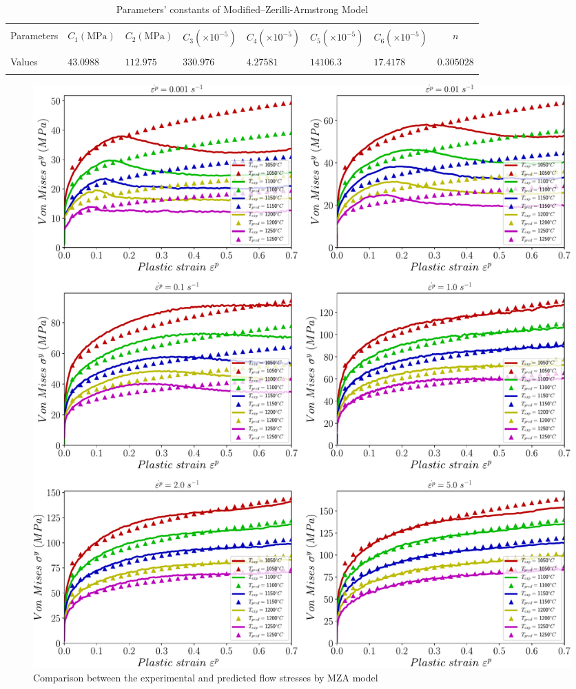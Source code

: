 \documentclass[twoside,english,1p,final,sort&compress]{elsarticle}
\theoremstyle{plain}
\begin{document}
\begin{table}[h!]
\centering{}
\caption{Parameters' constants of Modified--Zerilli-Armstrong Model}
\begin{tabular}{lllllllc}
\hline
&         &             &		   &		 &			   &&\\
Parameters&$C_1(\text{MPa})$    &$C_2(\text{MPa})$        & $C_3(\times10^{-5})$     & $C_4(\times10^{-5})$   & $C_5(\times10^{-5})$       &$C_6(\times10^{-5})$&$n$\\
&         &             &		   &	     &	           &&\\
\hline
Values&$43.0988$&$112.975$& $330.976$&$4.27581$&$14106.3$&$17.4178$&$0.305028$\\
\hline
\label{tab: MZAparameters}
\end{tabular}
\end{table}
\begin{figure}[!ht]
\centering
\includegraphics[width=1.02\columnwidth]
{Figures/CompExpMZA}
\caption{Comparison between the experimental and predicted flow stresses by MZA model}
\label{fig:iCorrelationMZA}
\end{figure}
\FloatBarrier

\end{document}
